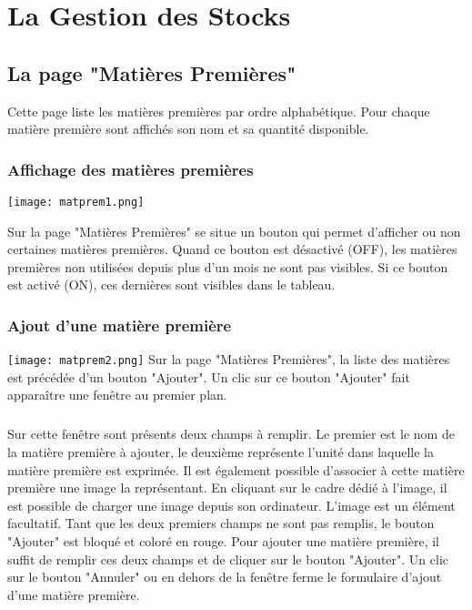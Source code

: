 \chapter{La Gestion des Stocks}

\section{La page "Matières Premières"}
Cette page liste les matières premières par ordre alphabétique. Pour chaque 
matière première sont affichés son nom et sa quantité disponible.

\subsection{Affichage des matières premières}

\texttt{[image: matprem1.png]}

Sur la page "Matières Premières" se situe un bouton qui permet d'afficher ou non 
certaines matières premières. Quand ce bouton est désactivé (OFF), les matières 
premières non utilisées depuis plus d'un mois ne sont pas visibles. Si ce bouton
 est activé (ON), ces dernières sont visibles dans le tableau.


\subsection{Ajout d'une matière première}
\texttt{[image: matprem2.png]}
Sur la page "Matières Premières", la liste des matières est précédée d'un bouton
 "Ajouter". 
Un clic sur ce bouton "Ajouter" fait apparaître une fenêtre au premier plan. 

\paragraph{}
Sur cette fenêtre sont présents deux champs à remplir. Le premier est le nom de 
la matière première à ajouter, le deuxième représente l'unité dans laquelle la 
matière première est exprimée. Il est également possible d'associer à cette 
matière première une image la représentant. En cliquant sur le cadre dédié à 
l'image, il est possible de charger une image depuis son ordinateur. L'image est
un élément facultatif. Tant que les deux premiers champs ne sont pas remplis, 
le bouton "Ajouter" est bloqué et coloré en rouge. Pour ajouter une matière 
première, il suffit de remplir ces deux champs et de cliquer sur le bouton 
"Ajouter". Un clic sur le bouton "Annuler" ou en dehors de la fenêtre ferme 
le formulaire d'ajout d'une matière première.



